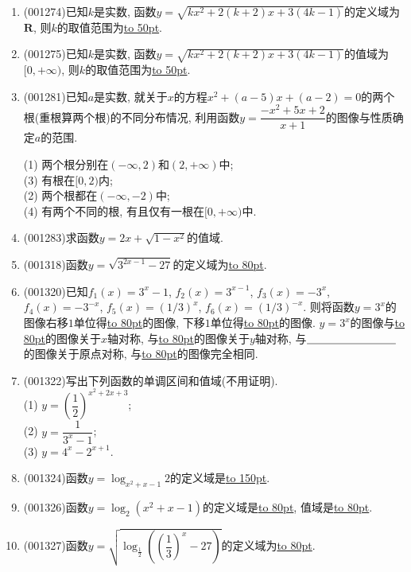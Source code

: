 \documentclass[10pt,a4paper]{article}
\newcommand{\blank}[1]{\underline{\hbox to #1pt{}}}
\begin{document}
\begin{enumerate}[1.]
(5) $y=\dfrac{1}{x^2+2x+2}$; \blank{80}\\ 
(6) $y=4-\sqrt{4x-4x^2}$; \blank{80}\\ 
(7) $y=\dfrac{x^2-x-2}{x^2+3x+2}$; \blank{80}\\ 
(8) $y=|x^2-2x-3|, \ x \in (\dfrac{1}{2},2]$; \blank{80}
\item {\tiny (001274)}已知$k$是实数, 函数$y=\sqrt{kx^2+2(k+2)x+3(4k-1)}$的定义域为$\mathbf{R}$, 则$k$的取值范围为\blank{50}.
\item {\tiny (001275)}已知$k$是实数, 函数$y=\sqrt{kx^2+2(k+2)x+3(4k-1)}$的值域为$[0,+\infty)$, 则$k$的取值范围为\blank{50}.
\item {\tiny (001281)}已知$a$是实数, 就关于$x$的方程$x^2+(a-5)x+(a-2)=0$的两个根(重根算两个根)的不同分布情况, 利用函数$y=\dfrac{-x^2+5x+2}{x+1}$的图像与性质确定$a$的范围.\\ 
\begin{multicols}{2}
(1) 两个根分别在$(-\infty,2)$和$(2,+\infty)$中;\\ 
(3) 有根在$[0,2)$内;\\ 
(2) 两个根都在$(-\infty,-2)$中;\\ 
(4) 有两个不同的根, 有且仅有一根在$[0,+\infty)$中.\\ 
\end{multicols}
\item {\tiny (001283)}求函数$y=2x+\sqrt{1-x^2}$的值域.
\item {\tiny (001318)}函数$y=\sqrt{3^{2x-1}-27}$的定义域为\blank{80}.
\item {\tiny (001320)}已知$f_1(x)=3^x-1$, $f_2(x)=3^{x-1}$, $f_3(x)=-3^x$, $f_4(x)=-3^{-x}$, $f_5(x)=(1/3)^x$, $f_6(x)=(1/3)^{-x}$. 则将函数$y=3^x$的图像右移$1$单位得\blank{80}的图像, 下移$1$单位得\blank{80}的图像. $y=3^x$的图像与\blank{80}的图像关于$x$轴对称, 与\blank{80}的图像关于$y$轴对称, 与$\blank{80}$的图像关于原点对称, 与\blank{80}的图像完全相同.
\item {\tiny (001322)}写出下列函数的单调区间和值域(不用证明).\\ 
(1) $y=\left(\dfrac{1}{2}\right)^{x^2+2x+3}$;\\ 
(2) $y=\dfrac{1}{3^x-1}$;\\ 
(3) $y=4^x-2^{x+1}$.
\item {\tiny (001324)}函数$y=\log_{x^2+x-1} 2$的定义域是\blank{150}.
\item {\tiny (001326)}函数$y=\log_2(x^2+x-1)$的定义域是\blank{80}, 值域是\blank{80}.
\item {\tiny (001327)}函数$y=\sqrt{\log_{\frac{1}{2}}\left(\left(\dfrac{1}{3}\right)^x-27\right)}$的定义域为\blank{80}.

\end{enumerate}
\end{document}
